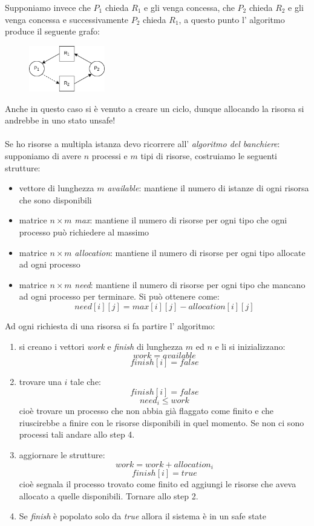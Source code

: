 Supponiamo invece che $P_1$ chieda $R_1$ e gli venga concessa, che $P_2$ chieda $R_2$ e gli venga concessa e successivamente $P_2$ chieda $R_1$, a questo punto l' algoritmo produce il seguente grafo:
\begin{figure}[H]
    \centering
    \includegraphics[width=125px]{images/8_Deadlock/third_state.png}
\end{figure}
Anche in questo caso si è venuto a creare un ciclo, dunque allocando la risorsa si andrebbe in uno stato unsafe!
\\
\\
Se ho risorse a multipla istanza devo ricorrere all' \emph{algoritmo del banchiere}: supponiamo di avere $n$ processi e $m$ tipi di risorse, costruiamo le seguenti strutture:
\begin{itemize}
    \item vettore di lunghezza $m$ \emph{available}: mantiene il numero di istanze di ogni risorsa che sono disponibili
    \item matrice $n \times m$ \emph{max}: mantiene il numero di risorse per ogni tipo che ogni processo può richiedere al massimo
    \item matrice $n \times m$ \emph{allocation}: mantiene il numero di risorse per ogni tipo allocate ad ogni processo
    \item matrice $n \times m$ \emph{need}: mantiene il numero di risorse per ogni tipo che mancano ad ogni processo per terminare. Si può ottenere come:
    $$ need[i][j] = max[i][j] - allocation[i][j] $$
\end{itemize}
Ad ogni richiesta di una risorsa si fa partire l' algoritmo:
\begin{enumerate}
    \item si creano i vettori \emph{work} e \emph{finish} di lunghezza $m$ ed $n$ e li si inizializzano:
    $$ work = available $$
    $$ finish[i] = false $$

    \item trovare una $i$ tale che:
    $$ finish[i] = false$$
    $$ need_i \leq work $$
    cioè trovare un processo che non abbia già flaggato come finito e che riuscirebbe a finire con le risorse disponibili in quel momento.
    Se non ci sono processi tali andare allo step 4.

    \item aggiornare le strutture:
    $$ work = work + allocation_i $$
    $$ finish[i] = true $$
    cioè segnala il processo trovato come finito ed aggiungi le risorse che aveva allocato a quelle disponibili.
    Tornare allo step 2.
    
    \item Se \emph{finish} è popolato solo da \emph{true} allora il sistema è in un safe state
\end{enumerate}

